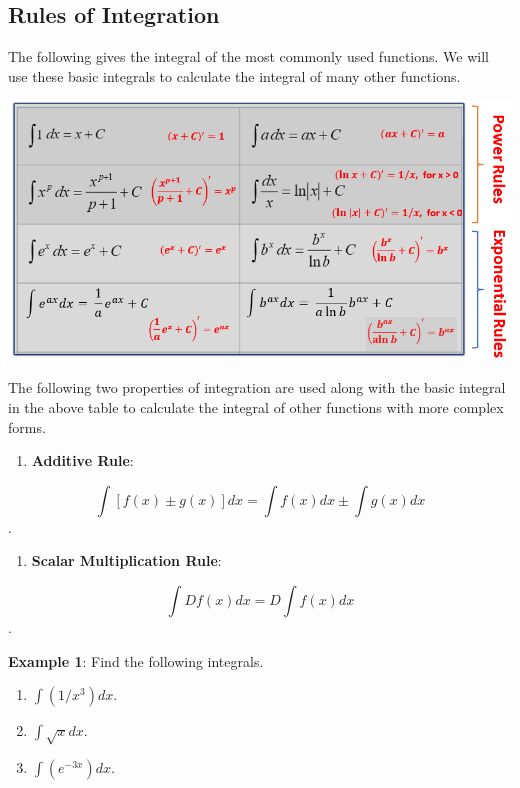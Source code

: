 \documentclass[
]{book}
\providecommand{\tightlist}{%
  \setlength{\itemsep}{0pt}\setlength{\parskip}{0pt}}
\begin{document}
\hfill\break

\hypertarget{rules-of-integration}{%
\subsection{Rules of Integration}\label{rules-of-integration}}

The following gives the integral of the most commonly used functions. We will use these basic integrals to calculate the integral of many other functions.

\begin{center}\includegraphics[width=0.65\linewidth]{img11/w11-IntegralTable} \end{center}

The following two properties of integration are used along with the basic integral in the above table to calculate the integral of other functions with more complex forms.

\begin{enumerate}
\def\labelenumi{\arabic{enumi}.}
\tightlist
\item
  \textbf{Additive Rule}:
\end{enumerate}

\textbf{\color{red}\huge \[\int [f(x) \pm g(x)] dx = \int f(x) dx \pm \int g(x) dx\]}.

\begin{enumerate}
\def\labelenumi{\arabic{enumi}.}
\setcounter{enumi}{1}
\tightlist
\item
  \textbf{Scalar Multiplication Rule}:
\end{enumerate}

\textbf{\color{red}\huge \[\int Df(x) dx = D\int f(x) dx \]}.

\hfill\break

\textbf{Example 1}: Find the following integrals.

\begin{enumerate}
\def\labelenumi{\arabic{enumi}.}
\item
  \(\int (1/x^3) dx\).
\item
  \(\int \sqrt{x} dx\).
\item
  \(\int (e^{-3x}) dx\).
\end{enumerate}
\end{document}
